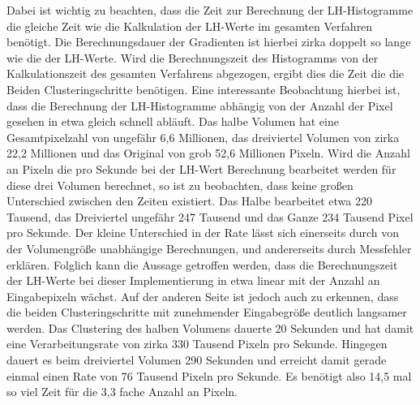 Dabei ist wichtig zu beachten, dass die Zeit zur Berechnung der LH-Histogramme die gleiche Zeit wie die Kalkulation der LH-Werte im gesamten Verfahren benötigt. Die Berechnungsdauer der Gradienten ist hierbei zirka doppelt so lange wie die der LH-Werte. Wird die Berechnungszeit des Histogramms von der Kalkulationszeit des gesamten Verfahrens abgezogen, ergibt dies die Zeit die die Beiden Clusteringschritte benötigen.
\newline
Eine interessante Beobachtung hierbei ist, dass die Berechnung der LH-Histogramme abhängig von der Anzahl der Pixel gesehen in etwa gleich schnell abläuft. Das halbe Volumen hat eine Gesamtpixelzahl von ungefähr 6,6 Millionen, das dreiviertel Volumen von zirka 22,2 Millionen und das Original von grob 52,6 Millionen Pixeln.
\newline
Wird die Anzahl an Pixeln die pro Sekunde bei der LH-Wert Berechnung bearbeitet werden für diese drei Volumen berechnet, so ist zu beobachten, dass keine großen Unterschied zwischen den Zeiten existiert.
\newline
Das Halbe bearbeitet etwa 220 Tausend, das Dreiviertel ungefähr 247 Tausend und das Ganze 234 Tausend Pixel pro Sekunde. Der kleine Unterschied in der Rate lässt sich einerseits durch von der Volumengröße unabhängige Berechnungen, und andererseits durch Messfehler erklären. Folglich kann die Aussage getroffen werden, dass die Berechnungszeit der LH-Werte bei dieser Implementierung in etwa linear mit der Anzahl an Eingabepixeln wächst.
\newline
Auf der anderen Seite ist jedoch auch zu erkennen, dass die beiden Clusteringschritte mit zunehmender Eingabegröße deutlich langsamer werden. Das Clustering des halben Volumens dauerte 20 Sekunden und hat damit eine Verarbeitungsrate von zirka 330 Tausend Pixeln pro Sekunde. Hingegen dauert es beim dreiviertel Volumen 290 Sekunden und erreicht damit gerade einmal einen Rate von 76 Tausend Pixeln pro Sekunde. Es benötigt also 14,5 mal so viel Zeit für die 3,3 fache Anzahl an Pixeln.














































